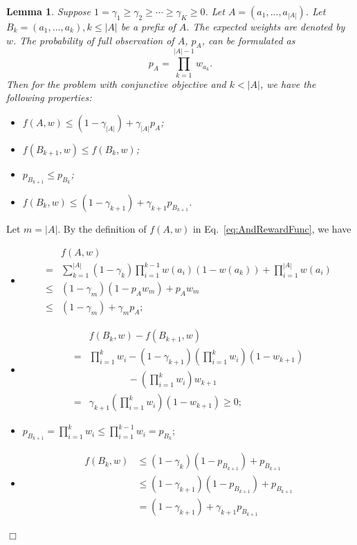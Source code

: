 \documentclass{article}
\newcommand{\abs}[1]{\left| #1 \right|}
\newtheorem{lemma}[theorem]{Lemma}%
\newenvironment{proof}{\noindent {\textbf{Proof. }}}{$\Box$ \medskip}
\begin{document}
\begin{lemma} %
	\label{lem:prefixRelation}
	Suppose $1 = \gamma_1 \geq \gamma_2 \geq \cdots \geq \gamma_K \geq 0$. Let $A = (a_1, ..., a_{\abs{A}})$. Let $B_k = (a_1, ..., a_k), k \leq \abs{A}$ be a prefix of $A$. The expected weights are denoted by $w$. The probability of full observation of $A$, $p_{A}$, can be formulated as
	$$
	p_{A} = \prod_{k=1}^{\abs{A}-1} w_{a_k}.
	$$
	Then for the problem with conjunctive objective and $k < \abs{A}$, we have the following properties:
	\begin{itemize}
		\item[(1)] $f(A, w) \leq (1-\gamma_{\abs{A}}) + \gamma_{\abs{A}} p_{A}$;
		\item[(2)] $f(B_{k+1}, w) \leq f(B_k, w)$;
		\item[(3)] $p_{B_{k+1}} \leq p_{B_k}$;
		\item[(4)] $f(B_k, w) \leq (1-\gamma_{k+1}) + \gamma_{k+1} p_{B_{k+1}}$.
	\end{itemize}
\end{lemma}
\begin{proof}
	Let $m = |A|$. By the definition of $f(A,w)$ in Eq.~\eqref{eq:AndRewardFunc}, we have
	\begin{itemize}
		\item[(1)]
		\begin{align*}
		&f(A,w) \\
		=& \sum_{k = 1}^{\abs{A}} (1-\gamma_k) \prod_{i = 1}^{k - 1} w(a_i) (1 - w(a_k)) + \prod_{i=1}^{\abs{A}}w(a_i) \\
		\leq& (1-\gamma_m)(1 - p_{A} w_m) + p_{A} w_m \\
		\leq& (1-\gamma_m) + \gamma_m p_{A};
		\end{align*}
		
		\item[(2)]
		\begin{align*}
		&f(B_k, w) - f(B_{k+1}, w)\\
		=&\prod_{i=1}^{k}w_i - (1-\gamma_{k+1}) (\prod_{i=1}^{k}w_i) (1 - w_{k+1}) \\
		&\qquad \qquad - (\prod_{i=1}^{k}w_i) w_{k+1}\\
		=&\gamma_{k+1} (\prod_{i=1}^{k}w_i) (1 - w_{k+1}) \geq 0;
		\end{align*}
		
		\item[(3)]
		$p_{B_{k+1}} = \prod_{i=1}^{k} w_i \leq \prod_{i=1}^{k-1} w_i = p_{B_k}$;
		
		\item[(4)]
		\begin{align*}
		f(B_k, w) & \leq (1-\gamma_k) (1 - p_{B_{k+1}}) + p_{B_{k+1}}\\
		&\leq (1-\gamma_{k+1}) (1 - p_{B_{k+1}}) + p_{B_{k+1}} \\
		&= (1-\gamma_{k+1}) + \gamma_{k+1} p_{B_{k+1}}
		\end{align*}
	\end{itemize}
\end{proof}
\end{document}
